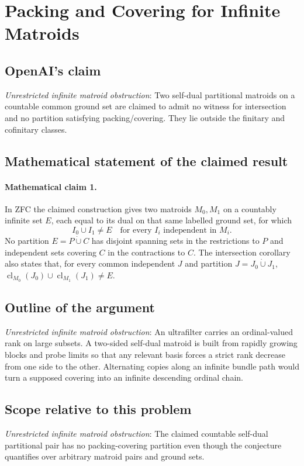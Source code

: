 \documentclass[11pt]{article}
\begin{document}
\section*{Packing and Covering for Infinite Matroids}

\subsection{OpenAI's claim}
\textit{Unrestricted infinite matroid obstruction}: Two self-dual partitional matroids on a countable common ground set are claimed to admit no witness for intersection and no partition satisfying packing/covering. They lie outside the finitary and cofinitary classes.

\subsection{Mathematical statement of the claimed result}
\paragraph{Mathematical claim 1.} In ZFC the claimed construction gives two matroids $M_0,M_1$ on a countably infinite set $E$, each equal to its dual on that same labelled ground set, for which \[I_0\cup I_1\ne E\quad\text{for every }I_i\text{ independent in }M_i.\] No partition $E=P\mathbin{\dot\cup}C$ has disjoint spanning sets in the restrictions to $P$ and independent sets covering $C$ in the contractions to $C$. The intersection corollary also states that, for every common independent $J$ and partition $J=J_0\mathbin{\dot\cup}J_1$, $\operatorname{cl}_{M_0}(J_0)\cup\operatorname{cl}_{M_1}(J_1)\ne E$.

\subsection{Outline of the argument}
\textit{Unrestricted infinite matroid obstruction}: An ultrafilter carries an ordinal-valued rank on large subsets. A two-sided self-dual matroid is built from rapidly growing blocks and probe limits so that any relevant basis forces a strict rank decrease from one side to the other. Alternating copies along an infinite bundle path would turn a supposed covering into an infinite descending ordinal chain.

\subsection{Scope relative to this problem}
\textit{Unrestricted infinite matroid obstruction}: The claimed countable self-dual partitional pair has no packing-covering partition even though the conjecture quantifies over arbitrary matroid pairs and ground sets.
\end{document}

